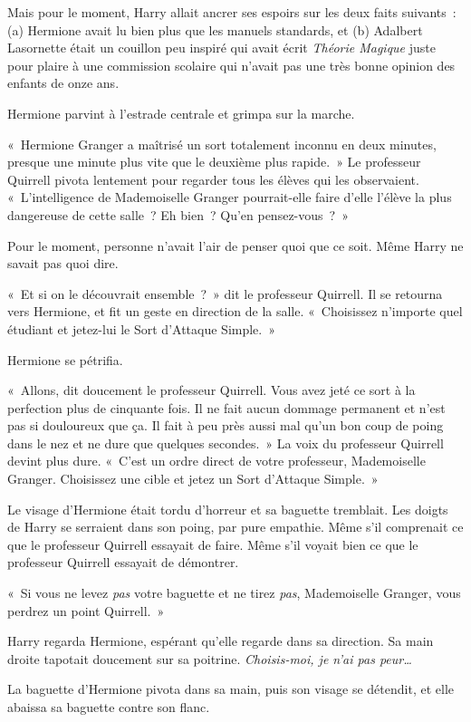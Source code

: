 Mais pour le moment, Harry allait ancrer ses espoirs sur les deux faits suivants~: (a) Hermione avait lu bien plus que les manuels standards, et (b) Adalbert Lasornette était un couillon peu inspiré qui avait écrit \emph{Théorie Magique} juste pour plaire à une commission scolaire qui n'avait pas une très bonne opinion des enfants de onze ans.

Hermione parvint à l'estrade centrale et grimpa sur la marche.

«~Hermione Granger a maîtrisé un sort totalement inconnu en deux minutes, presque une minute plus vite que le deuxième plus rapide.~» Le professeur Quirrell pivota lentement pour regarder tous les élèves qui les observaient. «~L'intelligence de Mademoiselle Granger pourrait-elle faire d'elle l'élève la plus dangereuse de cette salle~? Eh bien~? Qu'en pensez-vous~?~»

Pour le moment, personne n'avait l'air de penser quoi que ce soit. Même Harry ne savait pas quoi dire.

«~Et si on le découvrait ensemble~?~» dit le professeur Quirrell. Il se retourna vers Hermione, et fit un geste en direction de la salle. «~Choisissez n'importe quel étudiant et jetez-lui le Sort d'Attaque Simple.~»

Hermione se pétrifia.

«~Allons, dit doucement le professeur Quirrell. Vous avez jeté ce sort à la perfection plus de cinquante fois. Il ne fait aucun dommage permanent et n'est pas si douloureux que ça. Il fait à peu près aussi mal qu'un bon coup de poing dans le nez et ne dure que quelques secondes.~» La voix du professeur Quirrell devint plus dure. «~C'est un ordre direct de votre professeur, Mademoiselle Granger. Choisissez une cible et jetez un Sort d'Attaque Simple.~»

Le visage d'Hermione était tordu d'horreur et sa baguette tremblait. Les doigts de Harry se serraient dans son poing, par pure empathie. Même s'il comprenait ce que le professeur Quirrell essayait de faire. Même s'il voyait bien ce que le professeur Quirrell essayait de démontrer.

«~Si vous ne levez \emph{pas} votre baguette et ne tirez \emph{pas}, Mademoiselle Granger, vous perdrez un point Quirrell.~»

Harry regarda Hermione, espérant qu'elle regarde dans sa direction. Sa main droite tapotait doucement sur sa poitrine. \emph{Choisis-moi, je n'ai pas peur…}

La baguette d'Hermione pivota dans sa main, puis son visage se détendit, et elle abaissa sa baguette contre son flanc.

